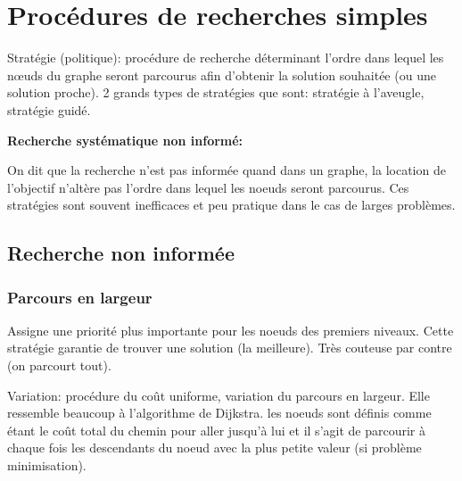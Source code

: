 

\section{Procédures de recherches simples}


Stratégie (politique): procédure de recherche déterminant l'ordre dans lequel les nœuds du graphe seront parcourus afin d'obtenir la solution souhaitée (ou une solution proche).
2 grands types de stratégies que sont: stratégie à l'aveugle, stratégie guidé.

\textbf{Recherche systématique non informé:}

On dit que la recherche n'est pas informée quand dans un graphe, la location de l'objectif n'altère pas l'ordre dans lequel les noeuds seront parcourus.
Ces stratégies sont souvent inefficaces et peu pratique dans le cas de larges problèmes.

\subsection{Recherche non informée}

\subsubsection{Parcours en largeur}
Assigne une priorité plus importante pour les noeuds des premiers niveaux. Cette stratégie garantie de trouver une solution (la meilleure). Très couteuse par contre (on parcourt tout).

Variation: procédure du coût uniforme, variation du parcours en largeur. Elle ressemble beaucoup à l'algorithme de Dijkstra. les noeuds sont définis comme étant le coût total du chemin pour aller jusqu'à lui et il s'agit de parcourir à chaque fois les descendants du noeud avec la plus petite valeur (si problème minimisation).

